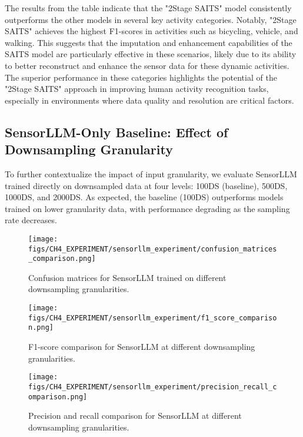 The results from the table indicate that the "2Stage SAITS" model consistently outperforms the other models in several key activity categories. Notably, "2Stage SAITS" achieves the highest F1-scores in activities such as bicycling, vehicle, and walking. This suggests that the imputation and enhancement capabilities of the SAITS model are particularly effective in these scenarios, likely due to its ability to better reconstruct and enhance the sensor data for these dynamic activities. The superior performance in these categories highlights the potential of the "2Stage SAITS" approach in improving human activity recognition tasks, especially in environments where data quality and resolution are critical factors.

\clearpage

\subsection{SensorLLM-Only Baseline: Effect of Downsampling Granularity}

\hspace{2em}To further contextualize the impact of input granularity, we evaluate SensorLLM trained directly on downsampled data at four levels: 100DS (baseline), 500DS, 1000DS, and 2000DS. As expected, the baseline (100DS) outperforms models trained on lower granularity data, with performance degrading as the sampling rate decreases.

\begin{figure}[H]
    \centering
    \texttt{[image: figs/CH4\_EXPERIMENT/sensorllm\_experiment/confusion\_matrices\_comparison.png]}
    \caption{Confusion matrices for SensorLLM trained on different downsampling granularities.}
    \label{fig:sensorllm_confusion_matrices}
\end{figure}

\begin{figure}[H]
    \centering
    \texttt{[image: figs/CH4\_EXPERIMENT/sensorllm\_experiment/f1\_score\_comparison.png]}
    \caption{F1-score comparison for SensorLLM at different downsampling granularities.}
    \label{fig:sensorllm_f1_score}
\end{figure}

\begin{figure}[H]
    \centering
    \texttt{[image: figs/CH4\_EXPERIMENT/sensorllm\_experiment/precision\_recall\_comparison.png]}
    \caption{Precision and recall comparison for SensorLLM at different downsampling granularities.}
    \label{fig:sensorllm_precision_recall}
\end{figure}

